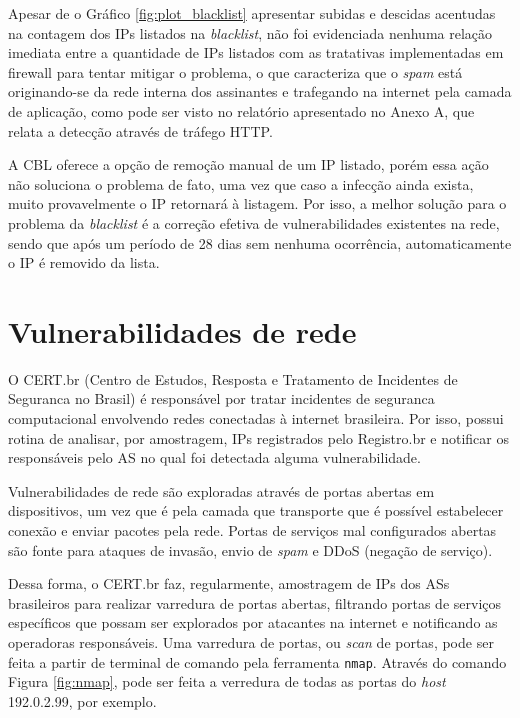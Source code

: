     Apesar de o Gráfico \ref{fig:plot_blacklist} apresentar subidas e descidas acentudas na contagem dos IPs listados na \textit{blacklist}, não foi evidenciada nenhuma relação imediata entre a quantidade de IPs listados com as tratativas implementadas em firewall para tentar mitigar o problema, o que caracteriza que o \textit{spam} está originando-se da rede interna dos assinantes e trafegando na internet pela camada de aplicação, como pode ser visto no relatório apresentado no Anexo A, que relata a detecção através de tráfego HTTP. 
    
    A CBL oferece a opção de remoção manual de um IP listado, porém essa ação não soluciona o problema de fato, uma vez que caso a infecção ainda exista, muito provavelmente o IP retornará à listagem. Por isso, a melhor solução para o problema da \textit{blacklist} é a correção efetiva de vulnerabilidades existentes na rede, sendo que após um período de 28 dias sem nenhuma ocorrência, automaticamente o IP é removido da lista.

\section{Vulnerabilidades de rede}

    O CERT.br (Centro de Estudos, Resposta e Tratamento de Incidentes de Seguranca no Brasil) é responsável por tratar incidentes de seguranca computacional envolvendo redes conectadas à internet brasileira. Por isso, possui rotina de analisar, por amostragem, IPs registrados pelo Registro.br e notificar os responsáveis pelo AS no qual foi detectada alguma vulnerabilidade.
    
    Vulnerabilidades de rede são exploradas através de portas abertas em dispositivos, um vez que é pela camada que transporte que é possível estabelecer conexão e enviar pacotes pela rede. Portas de serviços mal configurados abertas são fonte para ataques de invasão, envio de \textit{spam} e DDoS (negação de serviço).
    
    Dessa forma, o CERT.br faz, regularmente, amostragem de IPs dos ASs brasileiros para realizar varredura de portas abertas, filtrando portas de serviços específicos que possam ser explorados por atacantes na internet e notificando as operadoras responsáveis. Uma varredura de portas, ou \textit{scan} de portas, pode ser feita a partir de terminal de comando pela ferramenta {\tt nmap}. Através do comando Figura \ref{fig:nmap}, pode ser feita a verredura de todas as portas do \textit{host} 192.0.2.99, por exemplo.

